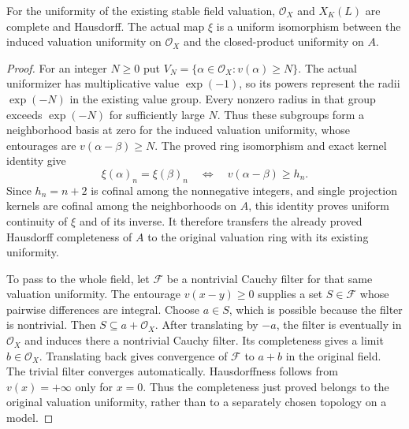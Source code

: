 \begin{theorem}
\label{fw:norm-limit-valuation-complete}
\leanok
For the uniformity of the existing stable field valuation,
$\mathcal O_X$ and $X_K(L)$ are complete and Hausdorff.
The actual map $\xi$ is a uniform isomorphism between the induced
valuation uniformity on $\mathcal O_X$ and the closed-product
uniformity on $A$.
\end{theorem}
\begin{proof}
For an integer $N\geq0$ put
$V_N=\{\alpha\in\mathcal O_X:v(\alpha)\geq N\}$.
The actual uniformizer has multiplicative value $\exp(-1)$, so its
powers represent the radii $\exp(-N)$ in the existing value group.
Every nonzero radius in that group exceeds $\exp(-N)$ for sufficiently
large $N$. Thus these subgroups form a neighborhood basis at zero for
the induced valuation uniformity, whose entourages are
$v(\alpha-\beta)\geq N$. The proved ring isomorphism and exact kernel
identity give
\[
 \xi(\alpha)_n=\xi(\beta)_n
 \quad\Longleftrightarrow\quad
 v(\alpha-\beta)\geq h_n.
\]
Since $h_n=n+2$ is cofinal among the nonnegative integers, and single
projection kernels are cofinal among the neighborhoods on $A$, this
identity proves uniform continuity of $\xi$ and of its inverse.
It therefore transfers the already proved Hausdorff completeness of
$A$ to the original valuation ring with its existing uniformity.

To pass to the whole field, let $\mathcal F$ be a nontrivial Cauchy
filter for that same valuation uniformity. The entourage
$v(x-y)\geq0$ supplies a set $S\in\mathcal F$ whose pairwise
differences are integral. Choose $a\in S$, which is possible because
the filter is nontrivial. Then $S\subseteq a+\mathcal O_X$.
After translating by $-a$, the filter is eventually in
$\mathcal O_X$ and induces there a nontrivial Cauchy filter.
Its completeness gives a limit $b\in\mathcal O_X$.
Translating back gives convergence of $\mathcal F$ to $a+b$ in the
original field. The trivial filter converges automatically.
Hausdorffness follows from $v(x)=+\infty$ only for $x=0$.
Thus the completeness just proved belongs to the original valuation
uniformity, rather than to a separately chosen topology on a model.
\end{proof}

